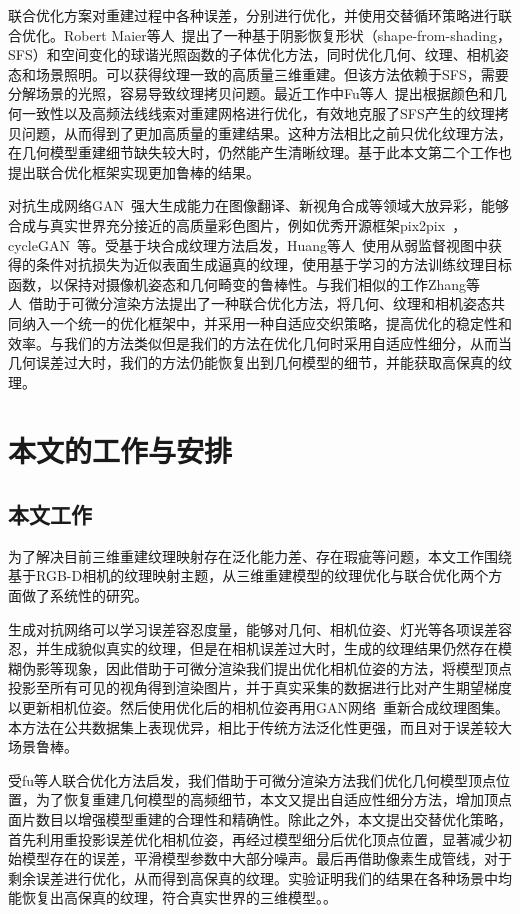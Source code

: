 \vspace*{2mm}联合优化方案对重建过程中各种误差，分别进行优化，并使用交替循环策略进行联合优化。Robert Maier等人~\cite{RobertMaier2017Intrinsic3DH3}提出了一种基于阴影恢复形状（shape-from-shading，SFS）和空间变化的球谐光照函数的子体优化方法，同时优化几何、纹理、相机姿态和场景照明。可以获得纹理一致的高质量三维重建。但该方法依赖于SFS，需要分解场景的光照，容易导致纹理拷贝问题。最近工作中Fu等人~\cite{YanpingFu2020JointTA}提出根据颜色和几何一致性以及高频法线线索对重建网格进行优化，有效地克服了SFS产生的纹理拷贝问题，从而得到了更加高质量的重建结果。这种方法相比之前只优化纹理方法，在几何模型重建细节缺失较大时，仍然能产生清晰纹理。基于此本文第二个工作也提出联合优化框架实现更加鲁棒的结果。\par
\vspace*{2mm}对抗生成网络GAN~\cite{NIPS2014_5ca3e9b1}强大生成能力在图像翻译、新视角合成等领域大放异彩，能够合成与真实世界充分接近的高质量彩色图片，例如优秀开源框架pix2pix~\cite{isola2017image}，cycleGAN~\cite{  zhu2017unpaired}等。受基于块合成纹理方法启发，Huang等人~\cite{JingweiHuang2020AdversarialTO}使用从弱监督视图中获得的条件对抗损失为近似表面生成逼真的纹理，使用基于学习的方法训练纹理目标函数，以保持对摄像机姿态和几何畸变的鲁棒性。与我们相似的工作Zhang等人~\cite{9705143}借助于可微分渲染方法提出了一种联合优化方法，将几何、纹理和相机姿态共同纳入一个统一的优化框架中，并采用一种自适应交织策略，提高优化的稳定性和效率。与我们的方法类似但是我们的方法在优化几何时采用自适应性细分，从而当几何误差过大时，我们的方法仍能恢复出到几何模型的细节，并能获取高保真的纹理。

\section{本文的工作与安排}

\subsection{本文工作}
为了解决目前三维重建纹理映射存在泛化能力差、存在瑕疵等问题，本文工作围绕基于RGB-D相机的纹理映射主题，从三维重建模型的纹理优化与联合优化两个方面做了系统性的研究。\par
生成对抗网络可以学习误差容忍度量，能够对几何、相机位姿、灯光等各项误差容忍，并生成貌似真实的纹理，但是在相机误差过大时，生成的纹理结果仍然存在模糊伪影等现象，因此借助于可微分渲染我们提出优化相机位姿的方法，将模型顶点投影至所有可见的视角得到渲染图片，并于真实采集的数据进行比对产生期望梯度以更新相机位姿。然后使用优化后的相机位姿再用GAN网络~\cite{chanmonteiro2020pi-GAN}重新合成纹理图集。本方法在公共数据集上表现优异，相比于传统方法泛化性更强，而且对于误差较大场景鲁棒。\par
受fu等人联合优化方法启发，我们借助于可微分渲染方法我们优化几何模型顶点位置，为了恢复重建几何模型的高频细节，本文又提出自适应性细分方法，增加顶点面片数目以增强模型重建的合理性和精确性。除此之外，本文提出交替优化策略，首先利用重投影误差优化相机位姿，再经过模型细分后优化顶点位置，显著减少初始模型存在的误差，平滑模型参数中大部分噪声。最后再借助像素生成管线，对于剩余误差进行优化，从而得到高保真的纹理。实验证明我们的结果在各种场景中均能恢复出高保真的纹理，符合真实世界的三维模型。。
